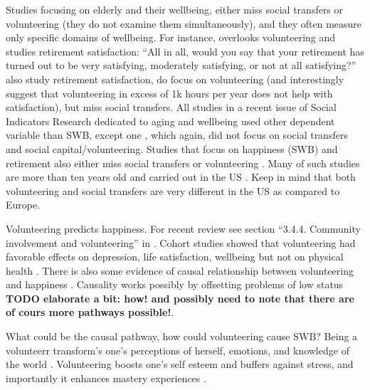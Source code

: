 \documentclass[10pt, letterpaper]{article}
\begin{document}
\begin{spacing}{1.4}
Studies focusing on elderly and their wellbeing, either miss social
transfers or volunteering (they do not examine them simultaneously), and they
often measure only specific domains of wellbeing. For instance,
\citet{bender12} overlooks volunteering and studies retirement satisfaction: ``All in all,
would you say that your retirement has turned out to be very satisfying,
moderately satisfying, or not at all satisfying?''
\citet{butrica2005satisfaction} also study retirement satisfaction, do focus on
volunteering (and interestingly suggest that volunteering in excess of 1k hours
per year does not help with satisfaction), but miss social transfers. All studies in a recent issue of Social Indicators Research \citep{jurges12} dedicated to aging and
wellbeing used other dependent variable than SWB, except one
\citep{angelini2012age}, which again, did not focus on social transfers and social capital/volunteering.
Studies that focus on happiness (SWB) and retirement also either miss social
transfers or volunteering
\citep{dingemans2014involuntary,dingemans2015retirement,nikolova2014employment,angelini2012age}.
 Many of such studies are more than ten years old and carried out in the US
\citep{wheeler98,ferring10}. %
 Keep in mind that both volunteering and social transfers are very different in
 the US as compared to Europe.

%
 Volunteering predicts happiness. For recent review see section 
 ``3.4.4. Community involvement and volunteering'' in \citet{dolan08al}. Cohort
 studies showed that volunteering had favorable effects on depression, life
 satisfaction, wellbeing but not on physical health \citep{jenkinson2013volunteering}.
 There is also some evidence of causal relationship between volunteering and
 happiness \citep{meier2008volunteering}.
Causality works possibly by offsetting problems
of low status \citep{borgonovi2008doing} \textbf{TODO elaborate a bit: how! and possibly
need to note that there are of cours more pathways possible!}.

What could be the causal pathway, how could volunteering cause SWB? Being a
volunteerr transform's one's perceptions of herself, emotions, and knowledge of
the world \citep{wilson12B}.%
Volunteering boosts one's self esteem and buffers against stress, and
importantly it enhances mastery experiences
\citep{wilson12B}. %



\end{spacing}
\end{document}
